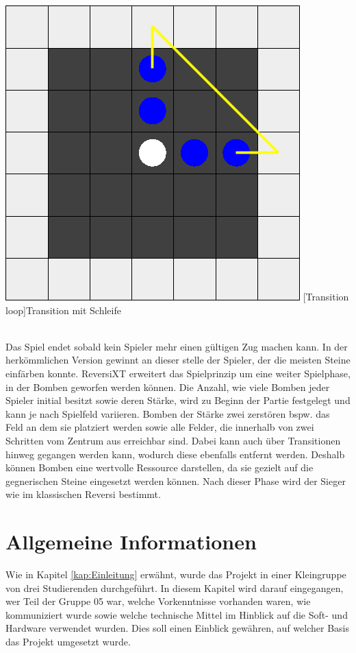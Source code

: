 \documentclass[12pt,a4paper,bibliography=totocnumbered,listof=totocnumbered]{article}
\begin{document}
\vspace{1em}
\begin{minipage}{\linewidth}
	\centering
	\includegraphics[width=0.4\linewidth]{pics/transition_loop.png}
	[Transition loop]{Transition mit Schleife}
	\label{fig:example_transition_loop}
\end{minipage}
\\

Das Spiel endet sobald kein Spieler mehr einen gültigen Zug machen kann. In der herkömmlichen Version gewinnt an dieser stelle der Spieler, der die meisten Steine einfärben konnte. ReversiXT erweitert das Spielprinzip um eine weiter Spielphase, in der Bomben geworfen werden können. Die Anzahl, wie viele Bomben jeder Spieler initial besitzt sowie deren Stärke, wird zu Beginn der Partie festgelegt und kann je nach Spielfeld variieren. Bomben der Stärke zwei zerstören bspw. das Feld an dem sie platziert werden sowie alle Felder, die innerhalb von zwei Schritten vom Zentrum aus erreichbar sind. Dabei kann auch über Transitionen hinweg gegangen werden kann, wodurch diese ebenfalls entfernt werden. Deshalb können Bomben eine wertvolle Ressource darstellen, da sie gezielt auf die gegnerischen Steine eingesetzt werden können. Nach dieser Phase wird der Sieger wie im klassischen Reversi bestimmt.


\newpage
\section{Allgemeine Informationen}
Wie in Kapitel \ref{kap:Einleitung} erwähnt, wurde das Projekt in einer Kleingruppe von drei Studierenden durchgeführt. In diesem Kapitel wird darauf eingegangen, wer Teil der Gruppe 05 war, welche Vorkenntnisse vorhanden waren, wie kommuniziert wurde sowie welche technische Mittel im Hinblick auf die Soft- und Hardware verwendet wurden. Dies soll einen Einblick gewähren, auf welcher Basis das Projekt umgesetzt wurde.
\end{document}
